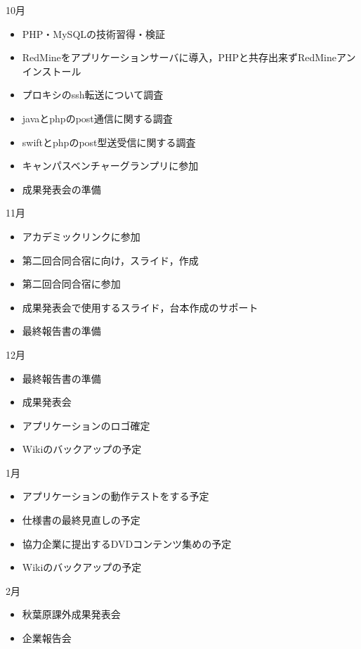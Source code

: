 10月
\begin{itemize}
\item PHP・MySQLの技術習得・検証
\item RedMineをアプリケーションサーバに導入，PHPと共存出来ずRedMineアンインストール
\item プロキシのssh転送について調査
\item javaとphpのpost通信に関する調査
\item swiftとphpのpost型送受信に関する調査
\item キャンパスベンチャーグランプリに参加
\item 成果発表会の準備
\end{itemize}
11月
\begin{itemize}
\item アカデミックリンクに参加
\item 第二回合同合宿に向け，スライド，作成
\item 第二回合同合宿に参加
\item 成果発表会で使用するスライド，台本作成のサポート
\item 最終報告書の準備
\end{itemize}
12月
\begin{itemize}
\item 最終報告書の準備
\item 成果発表会
\item アプリケーションのロゴ確定
\item Wikiのバックアップの予定
\end{itemize}
1月
\begin{itemize}
\item アプリケーションの動作テストをする予定
\item 仕様書の最終見直しの予定
\item 協力企業に提出するDVDコンテンツ集めの予定
\item Wikiのバックアップの予定
\end{itemize}
2月
\begin{itemize}
\item 秋葉原課外成果発表会
\item 企業報告会
\end{itemize}

